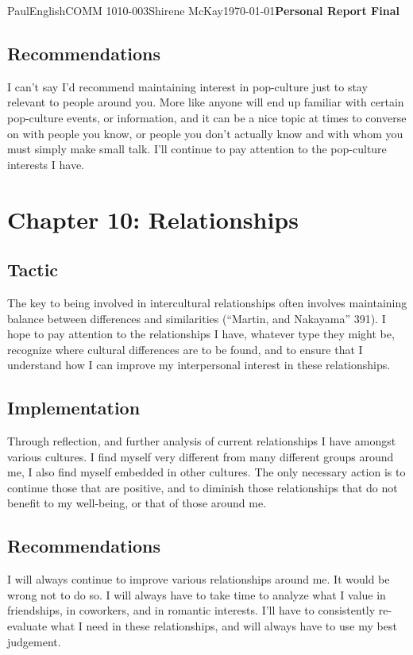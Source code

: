 \documentclass[12pt,letterpaper]{article}
\begin{document}
\begin{mla}{Paul}{English}{COMM 1010-003}{Shirene
    McKay}{\today}{\textbf{Personal Report Final}}
\subsection{Recommendations}

I can't say I'd recommend maintaining interest in pop-culture just to stay relevant to people around you. More like anyone will end up familiar with certain pop-culture events, or information, and it can be a nice topic at times to converse on with people you know, or people you don't actually know and with whom you must simply make small talk. I'll continue to pay attention to the pop-culture interests I have.

\section{Chapter 10: Relationships}


\subsection{Tactic}

The key to being involved in intercultural relationships often involves maintaining balance between differences and similarities (``Martin, and Nakayama'' 391). I hope to pay attention to the relationships I have, whatever type they might be, recognize where cultural differences are to be found, and to ensure that I understand how I can improve my interpersonal interest in these relationships.

\subsection{Implementation}

Through reflection, and further analysis of current relationships I have amongst various cultures. I find myself very different from many different groups around me, I also find myself embedded in other cultures. The only necessary action is to continue those that are positive, and to diminish those relationships that do not benefit to my well-being, or that of those around me.

\subsection{Recommendations}

I will always continue to improve various relationships around me. It would be wrong not to do so. I will always have to take time to analyze what I value in friendships, in coworkers, and in romantic interests. I'll have to consistently re-evaluate what I need in these relationships, and will always have to use my best judgement.


\end{mla}
\end{document}
